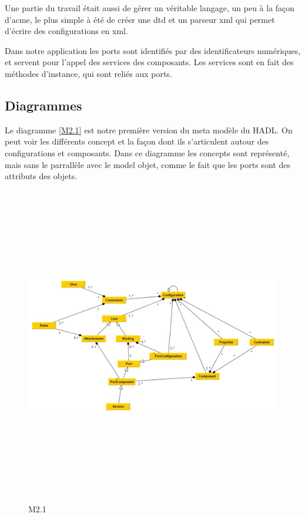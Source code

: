 \documentclass[11pt,a4paper]{article}
\begin{document}
Une partie du travail était aussi de gérer un véritable langage, un peu à la façon d'acme, le plus simple à été de créer une dtd et un parseur xml qui permet d'écrire des configurations en xml. 

Dans notre application les ports sont identifiés par des identificateurs numériques, et servent pour l'appel des services des composants. Les services sont en fait des méthodes d'instance, qui sont reliés aux ports.

\subsection{Diagrammes}

Le diagramme \ref{M2.1} est notre première version du meta modèle du HADL. On peut voir les différents concept et la façon dont ils s'articulent autour des configurations et composants. Dans ce diagramme les concepts sont représenté, mais sans le parrallèle avec le model objet, comme le fait que les ports sont des attributs des objets.

\begin{figure}[h]
  		\centering
  		\includegraphics[height=14cm,width=15cm]{M2.jpg}
  		\caption{M2.1}
  		\label{Premier meta modèle}
\end{figure}
\end{document}
